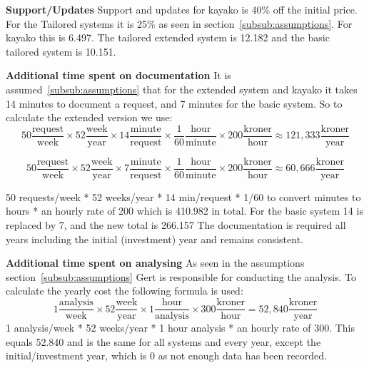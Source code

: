 \textbf{Support/Updates}
Support and updates for kayako is 40\% off the initial price. For the Tailored systems it is 25\% as seen in section~\ref{subsub:assumptions}. For kayako this is 6.497. The tailored extended system is 12.182 and the basic tailored system is 10.151.

\textbf{Additional time spent on documentation}
It is assumed~\ref{subsub:assumptions} that for the extended system and kayako it takes 14 minutes to document a request, and 7 minutes for the basic system.
So to calculate the extended version we use:
\[ 50 \frac{\mathrm{request}}{\mathrm{week}} \times 52 \frac{\mathrm{week}}{\mathrm{year}} \times 14\frac{\mathrm{minute}}{\mathrm{request}} \times \frac{1}{60} \frac{\mathrm{hour}}{\mathrm{minute}} \times 200\frac{\mathrm{kroner}}{\mathrm{hour}} \approx 121,333 \frac{\mathrm{kroner}}{\mathrm{year}} \]

\[ 50 \frac{\mathrm{request}}{\mathrm{week}} \times 52 \frac{\mathrm{week}}{\mathrm{year}} \times 7\frac{\mathrm{minute}}{\mathrm{request}} \times \frac{1}{60} \frac{\mathrm{hour}}{\mathrm{minute}} \times 200\frac{\mathrm{kroner}}{\mathrm{hour}} \approx 60,666 \frac{\mathrm{kroner}}{\mathrm{year}} \]

50 requests/week * 52 weeks/year * 14 min/request * 1/60 to convert minutes to hours * an hourly rate of 200 which is 410.982 in total. For the basic  system 14 is replaced by 7, and the new total is 266.157
The documentation is required all years including the initial (investment) year and remains consistent.

\textbf{Additional time spent on analysing}
As seen in the assumptions section~\ref{subsub:assumptions} Gert is responsible for conducting the analysis. To calculate the yearly cost the following formula is used:
\[ 1 \frac{\mathrm{analysis}}{\mathrm{week}} \times 52 \frac{\mathrm{week}}{\mathrm{year}} \times 1 \frac{\mathrm{hour}}{\mathrm{analysis}} \times 300 \frac{\mathrm{kroner}}{\mathrm{hour}} = 52,840 \frac{\mathrm{kroner}}{\mathrm{year}}\]
1 analysis/week * 52 weeks/year * 1 hour analysis * an hourly rate of 300. This equals 52.840 and is the same for all systems and every year, except the initial/investment year, which is 0 as not enough data has been recorded.


